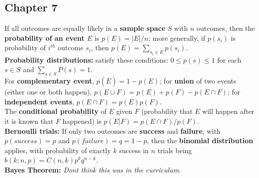 \documentclass[12pt]{article}
\begin{document}
\subsection{Chapter 7} 
If all outcomes are equally likely in a \textbf{sample space} $S$ with $n$ outcomes, then the \textbf{probability of an event $E$} is $p(E) =|E|/n$; more generally, if $p(s_i)$ is probability of $i^{th}$ outcome $s_i$, then $p(E) = \sum_{s_i \in E} p(s_i)$. \\
\textbf{Probability distributions:} satisfy these conditions: $0 \leq p(s) \leq 1$ for each $s \in S$ and $\sum_{s \in S} P(s) = 1$. \\
For \textbf{complementary event}, $p(\overline{E}) = 1 - p(E)$; for \textbf{union} of two events (either one or both happen), $p(E\cup F) = p(E) + p(F) - p(E \cap F)$; for \textbf{independent events}, $p(E \cap F) = p(E)p(F)$. \\
The \textbf{conditional probability} of $E$ given $F$ (probability that $E$ will happen after it is known that $F$ happened) is $p(E|F) = p (E \cap F)/p(F)$. \\
\textbf{Bernoulli trials:} If only two outcomes are \textbf{success} and \textbf{failure}, with $p(success) = p$ and $p(failure) = q = 1 - p$, then the \textbf{binomial distribution} applies, with probability of exactly $k$ success in $n$ trials being $b(k;n,p) = C(n,k)p^kq^{n-k}$. \\
\textbf{Bayes Theorem:} \textit{Dont think this was in the curriculum}.\\
\end{document}
